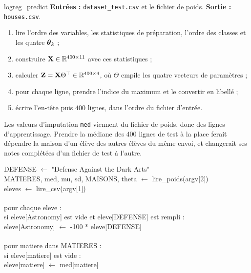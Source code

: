 \begin{procedure}{logreg\_predict}
\textbf{Entrées :} \texttt{dataset\_test.csv} et le fichier de poids.
\textbf{Sortie :} \texttt{houses.csv}.
\begin{enumerate}
  \item lire l'ordre des variables, les statistiques de préparation, l'ordre des
        classes et les quatre $\boldsymbol{\theta}_k$ ;
  \item construire $\mathbf{X}\in\mathbb{R}^{400\times11}$ avec ces statistiques ;
  \item calculer $\mathbf Z=\mathbf{X}\Theta^\top\in\mathbb{R}^{400\times4}$, où $\Theta$ empile
        les quatre vecteurs de paramètres ;
  \item pour chaque ligne, prendre l'indice du maximum et le convertir en
        libellé ;
  \item écrire l'en-tête puis $400$ lignes, dans l'ordre du fichier d'entrée.
\end{enumerate}
\end{procedure}

Les valeurs d'imputation \texttt{med} viennent du fichier de poids, donc des
lignes d'apprentissage. Prendre la médiane des $400$ lignes de test à la place
ferait dépendre la maison d'un élève des autres élèves du même envoi, et
changerait ses notes complétées d'un fichier de test à l'autre.

\begin{pseudo}
DEFENSE $\leftarrow$ "Defense Against the Dark Arts"\\
MATIERES, med, mu, sd, MAISONS, theta $\leftarrow$ lire\_poids(argv[2])\\
eleves $\leftarrow$ lire\_csv(argv[1])\\
\\
pour chaque eleve :\\
\hspace*{2em}si eleve[Astronomy] est vide et eleve[DEFENSE] est rempli :\\
\hspace*{4em}eleve[Astronomy] $\leftarrow$ -100 * eleve[DEFENSE]\\
\\
\hspace*{2em}pour matiere dans MATIERES :\\
\hspace*{4em}si eleve[matiere] est vide :\\
\hspace*{6em}eleve[matiere] $\leftarrow$ med[matiere]
\end{pseudo}

